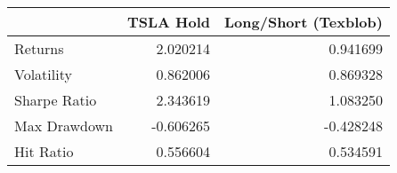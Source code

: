 \begin{tabular}{lrr}
\toprule
{} &  TSLA Hold &  Long/Short (Texblob) \\
\midrule
Returns      &   2.020214 &              0.941699 \\
Volatility   &   0.862006 &              0.869328 \\
Sharpe Ratio &   2.343619 &              1.083250 \\
Max Drawdown &  -0.606265 &             -0.428248 \\
Hit Ratio    &   0.556604 &              0.534591 \\
\bottomrule
\end{tabular}
